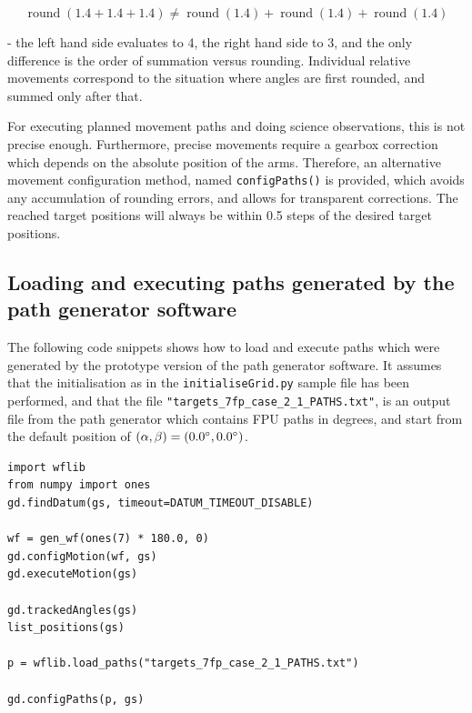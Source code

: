 \documentclass[fontsize=12,a4paper]{scrreprt}
\DeclareMathOperator{\round}{round}
\begin{document}
\[
\round(1.4 + 1.4 + 1.4)\neq \round(1.4) + \round(1.4) + \round(1.4)
\]

- the left hand side evaluates to 4, the right hand side to 3, and the
only difference is the order of summation versus rounding. Individual
relative movements correspond to the situation where angles are first
rounded, and summed only after that.

For executing planned movement paths and doing science observations,
this is not precise enough. Furthermore, precise movements require a
gearbox correction which depends on the absolute position of the arms.
Therefore, an alternative movement configuration method, named
\texttt{configPaths()} is provided, which avoids any accumulation of
rounding errors, and allows for transparent corrections. The reached
target positions will always be within 0.5 steps of the desired target
positions.


\subsection{Loading and executing paths generated by the path generator software}
\label{sec:loadingpaths}
%
%
%
%
%
%
%
%
%
%



The following code snippets shows how to load and execute paths which
were generated by the prototype version of the path generator
software. It assumes that the initialisation as in the
\texttt{initialiseGrid.py} sample file has been performed, and that
the file \texttt{"targets\_7fp\_case\_2\_1\_PATHS.txt"}, is an output file
from the path generator which contains FPU paths in degrees, and start
from the default position of $(\alpha,\beta) = (0.0\degree, 0.0\degree)$.

\begin{verbatim}
import wflib
from numpy import ones
gd.findDatum(gs, timeout=DATUM_TIMEOUT_DISABLE)

wf = gen_wf(ones(7) * 180.0, 0)
gd.configMotion(wf, gs)
gd.executeMotion(gs)

gd.trackedAngles(gs)
list_positions(gs)

p = wflib.load_paths("targets_7fp_case_2_1_PATHS.txt")

gd.configPaths(p, gs)
\end{verbatim}
\end{document}
